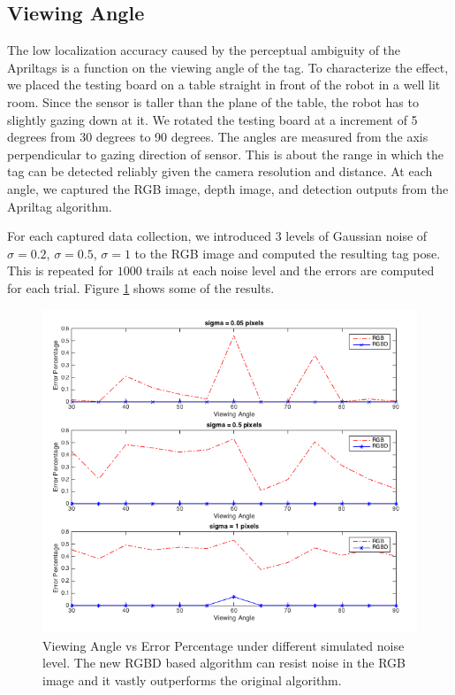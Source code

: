 \subsection{Viewing Angle}

The low localization accuracy caused by the perceptual ambiguity of the Apriltags is a function on the viewing angle of the tag. To characterize the effect, we placed the testing board on a table straight in front of the robot in a well lit room. Since the sensor is taller than the plane of the table, the robot has to slightly gazing down at it.  We rotated the testing board at a increment of 5 degrees from 30 degrees to 90 degrees. The angles are measured from the axis perpendicular to gazing direction of sensor. This is about the range in which the tag can be detected reliably given the camera resolution and distance. At each angle, we captured the RGB image, depth image, and detection outputs from the Apriltag algorithm. 

For each captured data collection, we introduced 3 levels of Gaussian noise of $\sigma = 0.2$, $\sigma = 0.5$, $\sigma = 1$  to the RGB image and computed the resulting tag pose. This is repeated for $1000$ trails at each noise level and the errors are computed for each trial. Figure \ref{fig:viewing_result} shows some of the results. 
\begin{figure}
\centering
\includegraphics[width=\columnwidth]{figs/viewing_angle_fig1}
\caption{Viewing Angle vs Error Percentage under different simulated noise level. The new RGBD based algorithm can resist noise in the RGB image and it vastly outperforms the original algorithm.}
\label{fig:viewing_result}
\end{figure}

